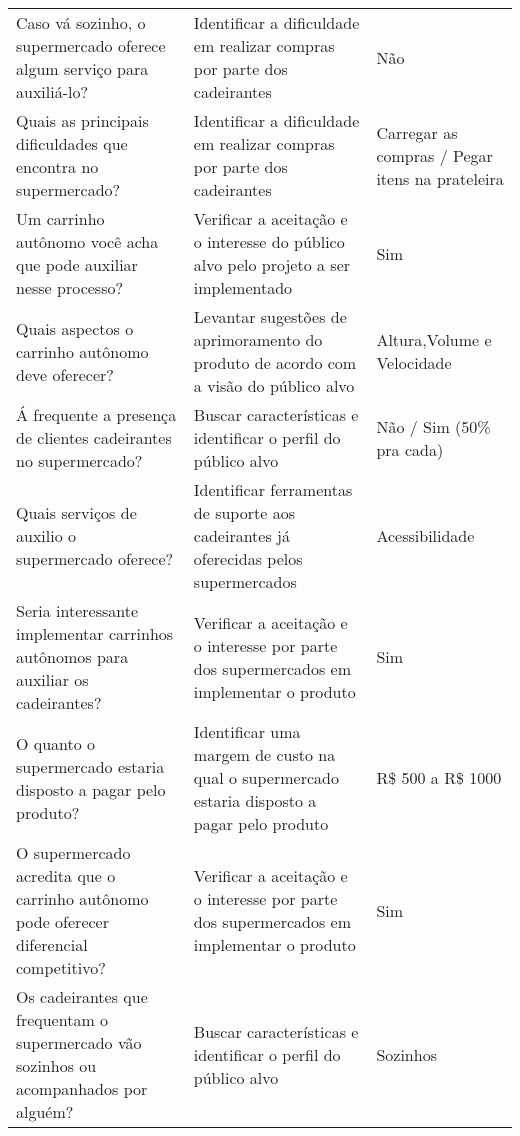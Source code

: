 \begin{apendicesenv}
\begin{sidewaystable}[]
{\begin{tabular}{lll}
Caso vá sozinho, o supermercado oferece algum serviço para auxiliá-lo?                 & Identificar a dificuldade em realizar compras por parte dos cadeirantes                      & Não                                             \\
Quais as principais dificuldades que encontra no supermercado?                         & Identificar a dificuldade em realizar compras por parte dos cadeirantes                      & Carregar as compras / Pegar itens na prateleira \\
Um carrinho autônomo você acha que pode auxiliar nesse processo?                       & Verificar a aceitação e o interesse do público alvo pelo projeto a ser implementado          & Sim                                             \\
Quais aspectos o carrinho autônomo deve oferecer?                                      & Levantar sugestões de aprimoramento do produto de acordo com a visão do público alvo         & Altura,Volume e Velocidade                      \\
Á frequente a presença de clientes cadeirantes no supermercado?                        & Buscar características e identificar o perfil do público alvo                                & Não / Sim (50\% pra cada)                       \\
Quais serviços de auxilio o supermercado oferece?                                      & Identificar ferramentas de suporte aos cadeirantes já oferecidas pelos supermercados         & Acessibilidade                                  \\
Seria interessante implementar carrinhos autônomos para auxiliar os cadeirantes?       & Verificar a aceitação e o interesse por parte dos supermercados em implementar o produto     & Sim                                             \\
O quanto o supermercado estaria disposto a pagar pelo produto?                         & Identificar uma margem de custo na qual o supermercado estaria disposto a pagar pelo produto & R\$ 500 a R\$ 1000                                \\
O supermercado acredita que o carrinho autônomo pode oferecer diferencial competitivo? & Verificar a aceitação e o interesse por parte dos supermercados em implementar o produto     & Sim                                             \\
Os cadeirantes que frequentam o supermercado vão sozinhos ou acompanhados por alguém?  & Buscar características e identificar o perfil do público alvo                                & Sozinhos                                       
\end{tabular}}
\end{sidewaystable}



\end{apendicesenv}
